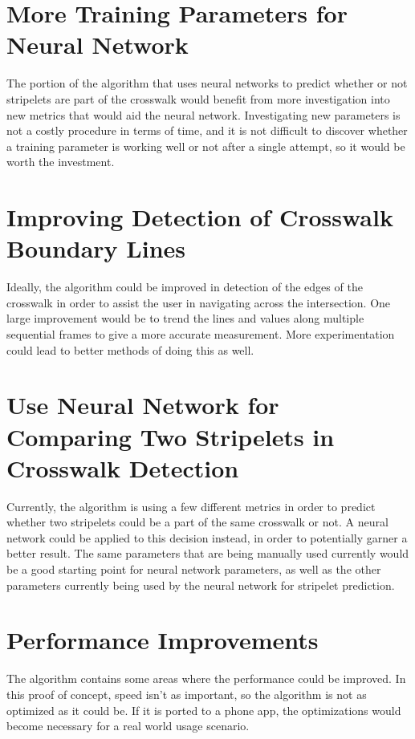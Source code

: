 \documentclass[12pt]{ucthesis}
\begin{document}
\section{More Training Parameters for Neural Network}

The portion of the algorithm that uses neural networks to predict whether or not stripelets are part of the crosswalk would benefit from more investigation into new metrics that would aid the neural network. Investigating new parameters is not a costly procedure in terms of time, and it is not difficult to discover whether a training parameter is working well or not after a single attempt, so it would be worth the investment.  

\section{Improving Detection of Crosswalk Boundary Lines}

Ideally, the algorithm could be improved in detection of the edges of the crosswalk in order to assist the user in navigating across the intersection. One large improvement would be to trend the lines and values along multiple sequential frames to give a more accurate measurement. More experimentation could lead to better methods of doing this as well. 

\section{Use Neural Network for Comparing Two Stripelets in Crosswalk Detection}

Currently, the algorithm is using a few different metrics in order to predict whether two stripelets could be a part of the same crosswalk or not. A neural network could be applied to this decision instead, in order to potentially garner a better result. The same parameters that are being manually used currently would be a good starting point for neural network parameters, as well as the other parameters currently being used by the neural network for stripelet prediction. 

\section{Performance Improvements}

The algorithm contains some areas where the performance could be improved. In this proof of concept, speed isn't as important, so the algorithm is not as optimized as it could be. If it is ported to a phone app, the optimizations would become necessary for a real world usage scenario.
\end{document}
